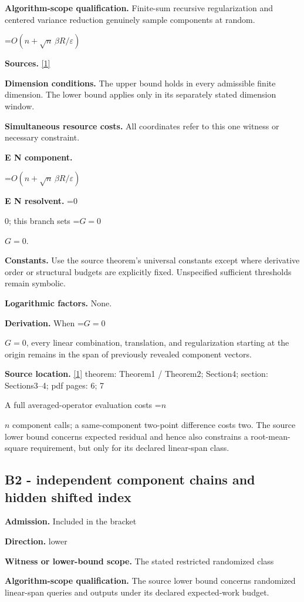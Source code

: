 \documentclass[10pt,a4paper]{article}
\newcommand{\AtlasMath}[1]{\par\begingroup\centering\setbox0=\hbox{$\displaystyle #1$}\ifdim\wd0>1.4\linewidth\typeout{ATLAS WIDE FORMULA: \the\wd0}\fi\ifdim\wd0>\linewidth\resizebox{\linewidth}{!}{\box0}\else\box0\fi\par\endgroup}
\newcommand{\AtlasInlineMath}[1]{\begingroup\setbox0=\hbox{$#1$}\ifdim\wd0>.4\linewidth\endgroup\AtlasMath{#1}\else\endgroup$#1$\fi}
\begin{document}
\textbf{Algorithm-scope qualification.} Finite-sum recursive regularization and centered variance reduction genuinely sample components at random.

\AtlasMath{O(n+\sqrt n\,\beta R/\varepsilon)}
\textbf{Sources.} \href{https://arxiv.org/pdf/2610.05038v1}{[1]}

\textbf{Dimension conditions.} The upper bound holds in every admissible finite dimension. The lower bound applies only in its separately stated dimension window.

\textbf{Simultaneous resource costs.} All coordinates refer to this one witness or necessary constraint.

\textbf{E N component.}

\AtlasMath{O(n+\sqrt n\,\beta R/\varepsilon)}
\textbf{E N resolvent.} \AtlasInlineMath{0}; this branch sets \AtlasInlineMath{G=0}.

\textbf{Constants.} Use the source theorem’s universal constants except where derivative order or structural budgets are explicitly fixed. Unspecified sufficient thresholds remain symbolic.

\textbf{Logarithmic factors.} None.

\textbf{Derivation.} When \AtlasInlineMath{G=0}, every linear combination, translation, and regularization starting at the origin remains in the span of previously revealed component vectors.

\textbf{Source location.} \href{https://arxiv.org/pdf/2610.05038v1}{[1]} theorem: Theorem1 / Theorem2; Section4; section: Sections3--4; pdf pages: 6; 7

A full averaged-operator evaluation costs \AtlasInlineMath{n} component calls; a same-component two-point difference costs two. The source lower bound concerns expected residual and hence also constrains a root-mean-square requirement, but only for its declared linear-span class.

\subsection{B2 - independent component chains and hidden shifted index}
\textbf{Admission.} Included in the bracket

\textbf{Direction.} lower

\textbf{Witness or lower-bound scope.} The stated restricted randomized class

\textbf{Algorithm-scope qualification.} The source lower bound concerns randomized linear-span queries and outputs under its declared expected-work budget.
\end{document}
